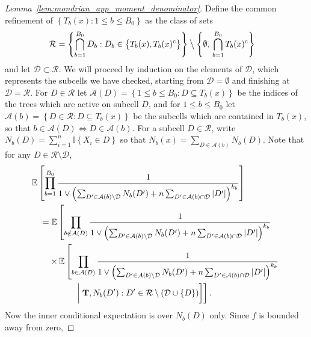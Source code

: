\documentclass[11pt,lof]{puthesis}
\newcommand{\E}{\ensuremath{\mathbb{E}}}
\newcommand{\I}{\ensuremath{\mathbb{I}}}
\newcommand{\comp}{\ensuremath{\mathrm{c}}}
\newcommand{\bT}{\ensuremath{\mathbf{T}}}
\newcommand{\cR}{\ensuremath{\mathcal{R}}}
\newcommand{\cA}{\ensuremath{\mathcal{A}}}
\newcommand{\cD}{\ensuremath{\mathcal{D}}}
\newcommand{\bigsetminus}{\mathbin{\big\backslash}}
\theoremstyle{break}
\theoremstyle{proof}
\newtheorem{proof}{Proof}
\begin{document}
\begin{proof}[Lemma~\ref{lem:mondrian_app_moment_denominator}]

  Define the common refinement of
  $\left\{ T_b(x) : 1 \leq b \leq {B_0} \right\}$ as
  the class of sets
  \begin{align*}
    \cR
    &= \left\{ \bigcap_{b=1}^{B_0} D_b :
      D_b \in
      \big\{ T_b(x), T_b(x)^{\comp} \big\}
    \right\}
    \bigsetminus
    \left\{
      \emptyset,\,
      \bigcap_{b=1}^{B_0}
      T_b(x)^\comp
    \right\}
  \end{align*}
  and let $\cD \subset \cR$.
  We will proceed by induction on the elements of $\cD$,
  which represents the subcells we have checked,
  starting from $\cD = \emptyset$ and finishing at $\cD = \cR$.
  For $D \in \cR$ let
  $\cA(D) = \left\{ 1 \leq b \leq {B_0} : D \subseteq T_b(x) \right\}$
  be the indices of the trees which are active on subcell $D$,
  and for $1 \leq b \leq {B_0}$ let
  $\cA(b) = \left\{ D \in \cR : D \subseteq T_b(x) \right\}$
  be the subcells which are contained in $T_b(x)$,
  so that $b \in \cA(D) \iff D \in \cA(b)$.
  For a subcell $D \in \cR$,
  write $N_b(D) = \sum_{i=1}^{n} \I \left\{ X_i \in D \right\}$
  so that $N_b(x) = \sum_{D \in \cA(b)} N_b(D)$.
  Note that for any $D \in \cR \setminus \cD$,
  \begin{align*}
    &\E \left[
      \prod_{b=1}^{B_0}
      \frac{1}{
        1 \vee \left(
          \sum_{D' \in \cA(b) \setminus \cD}
          N_b(D')
          + n \sum_{D' \in \cA(b) \cap \cD}
          |D'|
        \right)^{k_b}
      }
    \right] \\
    &\quad=
    \E \left[
      \prod_{b \notin \cA(D)}
      \frac{1}{
        1 \vee \left(
          \sum_{D' \in \cA(b) \setminus \cD}
          N_b(D')
          + n \sum_{D' \in \cA(b) \cap \cD}
          |D'|
        \right)^{k_b}
    } \right. \\
    &\left.
      \qquad
      \times\,\E\left[
        \prod_{b \in \cA(D)}
        \frac{1}{
          1 \vee \left(
            \sum_{D' \in \cA(b) \setminus \cD}
            N_b(D')
            + n \sum_{D' \in \cA(b) \cap \cD}
            |D'|
          \right)^{k_b}
    } \right.\right. \\
    &\left.\left.
        \quad\qquad\qquad\biggm|
        \bT,
        N_b(D') : D' \in \cR
        \setminus
        (\cD \cup \{D\})
      \right]
    \right].
  \end{align*}
  Now the inner conditional expectation is over $N_b(D)$ only.
  Since $f$ is bounded away from zero,

\end{proof}
\end{document}
